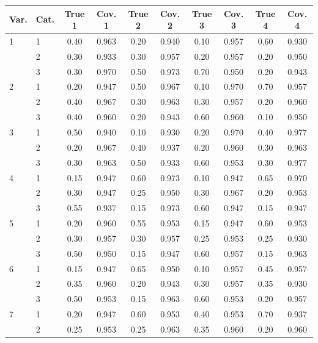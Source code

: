 \begin{longtable}{llcccccccc}
  \toprule
\textbf{Var.} & \textbf{Cat.} & \textbf{True 1} & \textbf{Cov. 1} & \textbf{True 2} & \textbf{Cov. 2} & \textbf{True 3} & \textbf{Cov. 3} & \textbf{True 4} & \textbf{Cov. 4} \\ 
  \midrule
1 & 1 & 0.40 & 0.963 & 0.20 & 0.940 & 0.10 & 0.957 & 0.60 & 0.930 \\ 
   & 2 & 0.30 & 0.933 & 0.30 & 0.957 & 0.20 & 0.957 & 0.20 & 0.950 \\ 
   & 3 & 0.30 & 0.970 & 0.50 & 0.973 & 0.70 & 0.950 & 0.20 & 0.943 \\ 
  2 & 1 & 0.20 & 0.947 & 0.50 & 0.967 & 0.10 & 0.970 & 0.70 & 0.957 \\ 
   & 2 & 0.40 & 0.967 & 0.30 & 0.963 & 0.30 & 0.957 & 0.20 & 0.960 \\ 
   & 3 & 0.40 & 0.960 & 0.20 & 0.943 & 0.60 & 0.960 & 0.10 & 0.950 \\ 
  3 & 1 & 0.50 & 0.940 & 0.10 & 0.930 & 0.20 & 0.970 & 0.40 & 0.977 \\ 
   & 2 & 0.20 & 0.967 & 0.40 & 0.937 & 0.20 & 0.960 & 0.30 & 0.963 \\ 
   & 3 & 0.30 & 0.963 & 0.50 & 0.933 & 0.60 & 0.953 & 0.30 & 0.977 \\ 
  4 & 1 & 0.15 & 0.947 & 0.60 & 0.973 & 0.10 & 0.947 & 0.65 & 0.970 \\ 
   & 2 & 0.30 & 0.947 & 0.25 & 0.950 & 0.30 & 0.967 & 0.20 & 0.953 \\ 
   & 3 & 0.55 & 0.937 & 0.15 & 0.973 & 0.60 & 0.947 & 0.15 & 0.947 \\ 
  5 & 1 & 0.20 & 0.960 & 0.55 & 0.953 & 0.15 & 0.947 & 0.60 & 0.953 \\ 
   & 2 & 0.30 & 0.957 & 0.30 & 0.957 & 0.25 & 0.953 & 0.25 & 0.930 \\ 
   & 3 & 0.50 & 0.950 & 0.15 & 0.947 & 0.60 & 0.957 & 0.15 & 0.963 \\ 
  6 & 1 & 0.15 & 0.947 & 0.65 & 0.950 & 0.10 & 0.957 & 0.45 & 0.957 \\ 
   & 2 & 0.35 & 0.960 & 0.20 & 0.943 & 0.30 & 0.957 & 0.35 & 0.930 \\ 
   & 3 & 0.50 & 0.953 & 0.15 & 0.963 & 0.60 & 0.953 & 0.20 & 0.957 \\ 
  7 & 1 & 0.20 & 0.947 & 0.60 & 0.953 & 0.40 & 0.953 & 0.70 & 0.937 \\ 
   & 2 & 0.25 & 0.953 & 0.25 & 0.963 & 0.35 & 0.960 & 0.20 & 0.960 \\ 

\end{longtable}
